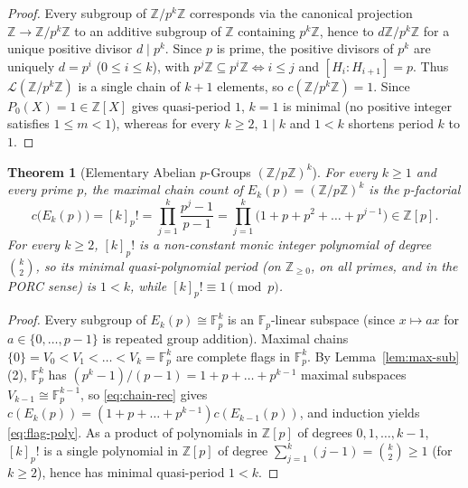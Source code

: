 \documentclass[11pt,a4paper]{article}
\newtheorem{theorem}{Theorem}[section]
\theoremstyle{definition}
\newcommand{\Fp}{\mathbb{F}_p}
\begin{document}
\begin{proof}
Every subgroup of $\mathbb{Z}/p^k\mathbb{Z}$ corresponds via the canonical projection $\mathbb{Z} \to \mathbb{Z}/p^k\mathbb{Z}$ to an additive subgroup of $\mathbb{Z}$ containing $p^k\mathbb{Z}$, hence to $d\mathbb{Z}/p^k\mathbb{Z}$ for a unique positive divisor $d \mid p^k$. Since $p$ is prime, the positive divisors of $p^k$ are uniquely $d = p^i$ ($0 \le i \le k$), with $p^j \mathbb{Z} \subseteq p^i \mathbb{Z} \iff i \le j$ and $[H_i : H_{i+1}] = p$. Thus $\mathcal{L}(\mathbb{Z}/p^k\mathbb{Z})$ is a single chain of $k + 1$ elements, so $c(\mathbb{Z}/p^k\mathbb{Z}) = 1$. Since $P_0(X) = 1 \in \mathbb{Z}[X]$ gives quasi-period $1$, $k = 1$ is minimal (no positive integer satisfies $1 \le m < 1$), whereas for every $k \ge 2$, $1 \mid k$ and $1 < k$ shortens period $k$ to $1$.
\end{proof}

\begin{theorem}[Elementary Abelian $p$-Groups $(\mathbb{Z}/p\mathbb{Z})^k$]\label{thm:elem-ab}
For every $k \ge 1$ and every prime $p$, the maximal chain count of $E_k(p) = (\mathbb{Z}/p\mathbb{Z})^k$ is the $p$-factorial
\begin{equation}\label{eq:flag-poly}
  c\bigl(E_k(p)\bigr) = [k]_p! = \prod_{j=1}^k \frac{p^j - 1}{p - 1} = \prod_{j=1}^k \bigl(1 + p + p^2 + \dots + p^{j-1}\bigr) \in \mathbb{Z}[p].
\end{equation}
For every $k \ge 2$, $[k]_p!$ is a non-constant monic integer polynomial of degree $\binom{k}{2}$, so its minimal quasi-polynomial period (on $\mathbb{Z}_{\ge 0}$, on all primes, and in the PORC sense) is $1 < k$, while $[k]_p! \equiv 1 \pmod p$.
\end{theorem}

\begin{proof}
Every subgroup of $E_k(p) \cong \Fp^k$ is an $\Fp$-linear subspace (since $x \mapsto a x$ for $a \in \{0, \dots, p-1\}$ is repeated group addition). Maximal chains $\{0\} = V_0 < V_1 < \dots < V_k = \Fp^k$ are complete flags in $\Fp^k$. By Lemma~\ref{lem:max-sub}(2), $\Fp^k$ has $(p^k - 1)/(p - 1) = 1 + p + \dots + p^{k-1}$ maximal subspaces $V_{k-1} \cong \Fp^{k-1}$, so \eqref{eq:chain-rec} gives $c(E_k(p)) = (1 + p + \dots + p^{k-1}) c(E_{k-1}(p))$, and induction yields \eqref{eq:flag-poly}. As a product of polynomials in $\mathbb{Z}[p]$ of degrees $0, 1, \dots, k-1$, $[k]_p!$ is a single polynomial in $\mathbb{Z}[p]$ of degree $\sum_{j=1}^k (j - 1) = \binom{k}{2} \ge 1$ (for $k \ge 2$), hence has minimal quasi-period $1 < k$.
\end{proof}
\end{document}
